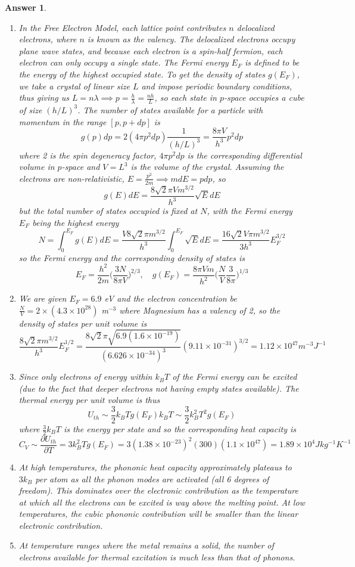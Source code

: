 \documentclass[a4paper]{article}
\newtheorem{ans}{Answer}[subsection]
\theoremstyle{new}
\begin{document}
\newpage
\begin{ans}\leavevmode
\begin{enumerate}[label=(\roman*)]
\item In the Free Electron Model, each lattice point contributes $n$ delocalized electrons, where $n$ is known as the valency. The delocalized electrons occupy plane wave states, and because each electron is a spin-half fermion, each electron can only occupy a single state. The Fermi energy $E_F$ is defined to be the energy of the highest occupied state. To get the density of states $g(E_F)$, we take a crystal of linear size $L$ and impose periodic boundary conditions, thus giving us $L=n\lambda\implies p=\frac{h}{\lambda}=\frac{nh}{L}$, so each state in $p$-space occupies a cube of size $(h/L)^3$. The number of states available for a particle with momentum in the range $[p,p+dp]$ is
$$g(p)dp=2(4\pi p^2dp)\frac{1}{(h/L)^3}=\frac{8\pi V}{h^3}p^2dp$$
where 2 is the spin degeneracy factor, $4\pi p^2dp$ is the corresponding differential volume in $p$-space and $V=L^3$ is the volume of the crystal. Assuming the electrons are non-relativistic, $E=\frac{p^2}{2m}\implies mdE=pdp$, so
$$g(E)dE=\frac{8\sqrt{2}\pi Vm^{3/2}}{h^3}\sqrt{E}dE$$
but the total number of states occupied is fixed at $N$, with the Fermi energy $E_F$ being the highest energy
$$N=\int_0^{E_F}g(E)dE=\frac{V8\sqrt{2}\pi m^{3/2}}{h^3}\int_0^{E_F}\sqrt{E}dE=\frac{16\sqrt{2}V\pi m^{3/2}}{3h^3}E_F^{3/2}$$
so the Fermi energy and the corresponding density of states is
$$E_F=\frac{h^2}{2m}\bigg(\frac{3N}{8\pi V}\bigg)^{2/3},\quad g(E_F)=\frac{8\pi Vm}{h^2}\bigg(\frac{N}{V}\frac{3}{8\pi}\bigg)^{1/3}$$
\item We are given $E_F=6.9$ eV and the electron concentration be $\frac{N}{V}=2\times(4.3\times10^{28})$ m$^{-3}$ where Magnesium has a valency of 2, so the density of states per unit volume is
$$\frac{8\sqrt{2}\pi m^{3/2}}{h^3}E_F^{1/2}=\frac{8\sqrt{2}\pi\sqrt{6.9(1.6\times10^{-19})}}{(6.626\times10^{-34})^3}(9.11\times10^{-31})^{3/2}=1.12\times10^{47}m^{-3}J^{-1}$$
\item Since only electrons of energy within $k_BT$ of the Fermi energy can be excited (due to the fact that deeper electrons not having empty states available). The thermal energy per unit volume is thus
$$U_{th}\sim\frac{3}{2}k_BTg(E_F)k_BT\sim \frac{3}{2}k_B^2T^2g(E_F)$$
where $\frac{3}{2}k_BT$ is the energy per state and so the corresponding heat capacity is
$$C_V\sim\frac{\partial U_{th}}{\partial T}=3k_B^2Tg(E_F)=3(1.38\times10^{-23})^2(300)(1.1\times10^{47})=1.89\times10^4Jkg^{-1}K^{-1}$$
\item At high temperatures, the phononic heat capacity approximately plateaus to $3k_B$ per atom as all the phonon modes are activated (all 6 degrees of freedom). This dominates over the electronic contribution as the temperature at which all the electrons can be excited is way above the melting point. At low temperatures, the cubic phononic contribution will be smaller than the linear electronic contribution.
\item At temperature ranges where the metal remains a solid, the number of electrons available for thermal excitation is much less than that of phonons.


\end{enumerate}
\end{ans}
\end{document}
